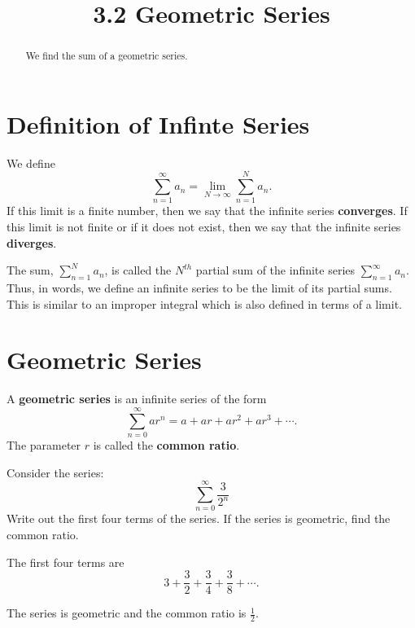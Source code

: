 \documentclass[handout]{ximera}
\title{3.2 Geometric Series}
\begin{document}
\begin{abstract}
We find the sum of a geometric series.
\end{abstract}

\maketitle

\section{Definition of Infinte Series}

\begin{definition}
We define
\[\sum_{n=1}^\infty a_n = \lim_{N \to \infty} \sum_{n=1}^N a_n.\]
If this limit is a finite number, then we say that the infinite series \textbf{converges}.
If this limit is not finite or if it does not exist, then we say that the infinite series \textbf{diverges}.

\end{definition}

\begin{remark}
The sum, $\displaystyle{\sum_{n=1}^N a_n}$, is called the $N^{th}$ partial sum of the infinite series
$\displaystyle{\sum_{n=1}^\infty a_n}$. Thus, in words, we define an infinite series to be the limit of its partial sums.
This is similar to an improper integral which is also defined in terms of a limit.
\end{remark}

\section{Geometric Series}

\begin{definition} A \textbf{geometric series} is an infinite series of the form
\[
\sum_{n=0}^\infty ar^n = a + ar + ar^2 + ar^3 + \cdots.
\]
The parameter $r$ is called the \textbf{common ratio}.
\end{definition}

\begin{example}[example 1]
Consider the series:
\[
 \sum_{n=0}^\infty \frac{3}{2^n} 
 \]
 Write out the first four terms of the series. If the series is geometric, find the common ratio.
 
 The first four terms are \[
 3 + \frac32 + \frac34 + \frac38 + \cdots.
 \]

 The series is geometric and the common ratio is $\frac12$.
 \end{example}
 
\end{document}
